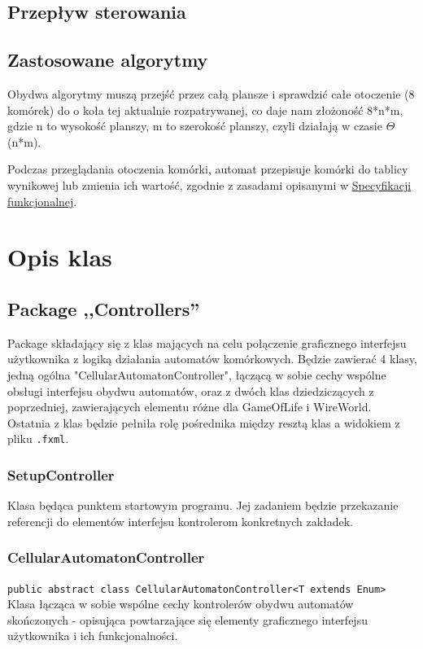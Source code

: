 \documentclass{report}
\begin{document}
\section{Przepływ sterowania}


\section{Zastosowane algorytmy}

Obydwa algorytmy muszą przejść przez całą plansze i sprawdzić całe otoczenie (8 komórek) do o koła tej aktualnie rozpatrywanej, co daje nam złożoność 8*n*m, gdzie n to wysokość planszy, m to szerokość planszy, czyli działają w czasie $\Theta$(n*m).

Podczas przeglądania otoczenia komórki, automat przepisuje komórki do tablicy wynikowej lub zmienia ich wartość, zgodnie z zasadami opisanymi w \href{https://github.com/boguszj/Wire-world/blob/master/Specyfikacja-funkcjonalna/Specyfikacja-funkcjonalna.pdf}{Specyfikacji funkcjonalnej}.


\chapter{Opis klas}

\section{Package ,,Controllers''}
Package składający się z klas mających na celu połączenie graficznego interfejsu użytkownika z logiką działania automatów komórkowych. Będzie zawierać 4 klasy, jedną ogólna "CellularAutomatonController", łączącą w sobie cechy wspólne obsługi interfejsu obydwu automatów, oraz z dwóch klas dziedziczących z poprzedniej, zawierających elementu różne dla GameOfLife i WireWorld. Ostatnia z klas będzie pełniła rolę pośrednika między resztą klas a widokiem z pliku \texttt{.fxml}.

\subsection{SetupController}
Klasa będąca punktem startowym programu. Jej zadaniem będzie przekazanie referencji do elementów interfejsu kontrolerom konkretnych zakładek.

\subsection{CellularAutomatonController} %
\texttt{public abstract class CellularAutomatonController<T extends Enum>}
Klasa łącząca w sobie wspólne cechy kontrolerów obydwu automatów skończonych - opisująca powtarzające się elementy graficznego interfejsu użytkownika i ich funkcjonalności.
\end{document}
